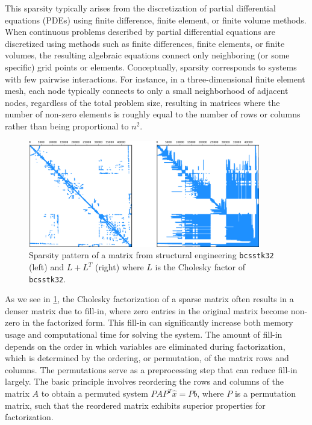  This sparsity typically arises from the discretization of partial differential equations (PDEs)\cite{schaeffer_sparse_2013} using finite difference, finite element, or finite volume methods. When continuous problems described by partial differential equations are discretized using methods such as finite differences, finite elements, or finite volumes, the resulting algebraic equations connect only neighboring (or some specific) grid points or elements. Conceptually, sparsity corresponds to systems with few pairwise interactions. For instance, in a three-dimensional finite element mesh, each node typically connects to only a small neighborhood of adjacent nodes, regardless of the total problem size, resulting in matrices where the number of non-zero elements is roughly equal to the number of rows or columns rather than being proportional to $n^2$. 


\begin{figure}[!h]
    \centering
    \includegraphics[width=0.9\textwidth]{fig/intro/sparsity_pattern.png}
    \caption{Sparsity pattern of a matrix from structural engineering \texttt{bcsstk32} (left) and \(L+L^T\) (right) where \(L\) is the Cholesky factor of \texttt{bcsstk32}.}
    \label{fig:sparse-matrix-example}
\end{figure}

As we see in \cref{fig:sparse-matrix-example}, the Cholesky factorization of a sparse matrix often results in a denser matrix due to fill-in, where zero entries in the original matrix become non-zero in the factorized form. This fill-in can significantly increase both memory usage and computational time for solving the system. The amount of fill-in depends on the order in which variables are eliminated during factorization, which is determined by the ordering, or permutation, of the matrix rows and columns. The permutations serve as a preprocessing step that can reduce fill-in largely. The basic principle involves reordering the rows and columns of the matrix $A$ to obtain a permuted system $PAP^T \hat{x} = Pb$, where $P$ is a permutation matrix, such that the reordered matrix exhibits superior properties for factorization. 

